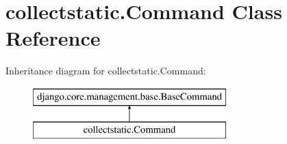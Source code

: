 \hypertarget{classcollectstatic_1_1_command}{}\section{collectstatic.\+Command Class Reference}
\label{classcollectstatic_1_1_command}
Inheritance diagram for collectstatic.\+Command\+:\begin{figure}[H]
\begin{center}
\leavevmode
\includegraphics[height=2.000000cm]{classcollectstatic_1_1_command}
\end{center}
\end{figure}
